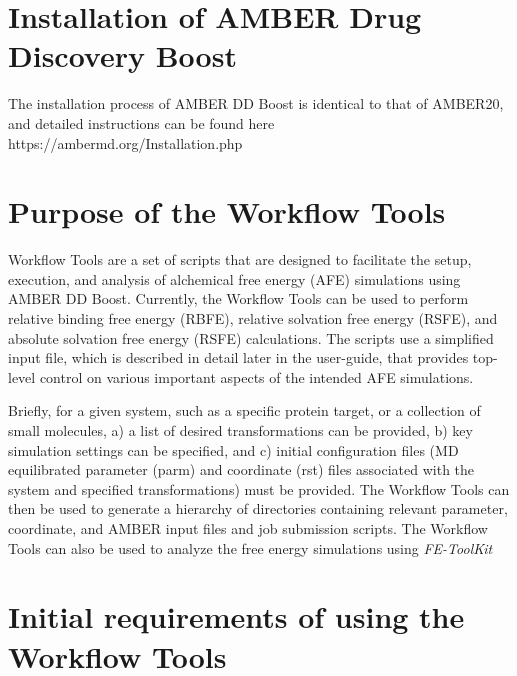 \documentclass[11pt,letterpaper,titlepage]{article}
\begin{document}
\vspace{0.1cm}
\section {Installation of AMBER Drug Discovery Boost}
\vspace{0.1cm}

The installation process of AMBER DD Boost is identical to that of 
AMBER20, and detailed instructions can be found here 
https://ambermd.org/Installation.php

\vspace{0.1cm}
\section{Purpose of the Workflow Tools}
\vspace{0.1cm}

Workflow Tools are a set of scripts that are designed to 
facilitate the setup, execution, and analysis of alchemical 
free energy (AFE) simulations using AMBER DD Boost. Currently, the 
Workflow Tools can be used to perform relative binding
free energy (RBFE), relative solvation free energy (RSFE), and 
absolute solvation free energy (RSFE) calculations. The scripts
use a
simplified input file, which is described in detail later in the 
user-guide, that provides top-level control on various important 
aspects of the intended AFE simulations. 

Briefly, for a given system, such as a specific protein target, or 
a collection of small molecules, 
a) a list of desired transformations can be provided, 
b) key simulation settings can be specified, and 
c) initial configuration files (MD equilibrated parameter (parm) and 
coordinate (rst) files associated with the system and
specified transformations) must be provided. 
The Workflow Tools can then be used to generate a hierarchy of directories 
containing relevant parameter, coordinate, and AMBER input files and job submission scripts. 
The Workflow Tools can also be used 
to analyze the free energy simulations using \textit{FE-ToolKit}


\vspace{0.1cm}
\section{Initial requirements of using the Workflow Tools}
\vspace{0.1cm}
\end{document}
